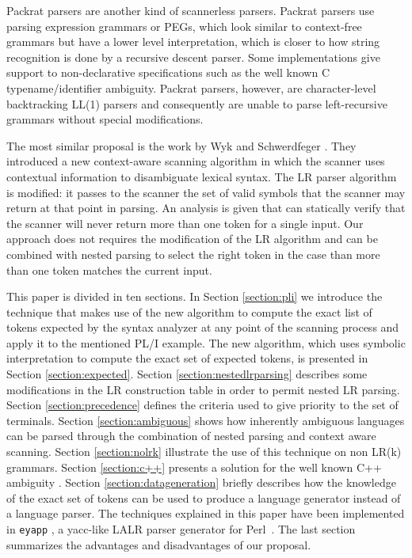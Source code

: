 Packrat parsers \cite{ford2,grimm} are another kind of
scannerless parsers. Packrat parsers use
parsing expression grammars or PEGs, 
which look similar to context-free grammars but have a lower level interpretation, 
which is closer to how string recognition is done by a recursive descent parser.
Some implementations \cite{grimm} give support 
to non-declarative specifications such as the well known C typename/identifier
ambiguity. 
Packrat parsers, however, are character-level backtracking LL(1) parsers
and consequently are unable to parse
left-recursive grammars without special modifications.

The most similar proposal is the work by Wyk and Schwerdfeger \cite{wyk}.
They introduced a new context-aware scanning algorithm in
which the scanner uses contextual information to disambiguate lexical
syntax. The LR parser algorithm is modified:
it passes to the scanner the set of valid symbols
that the scanner may return at that point in parsing. 
An analysis is given that can
statically verify that the scanner will never return more than one
token for a single input.
Our approach does not requires the modification of the LR algorithm
and can be combined with nested parsing to select the right token in the case than 
more than one token matches the current input.

This paper is divided in ten sections.
In Section
\ref{section:pli} 
we introduce the technique that makes use of
the new algorithm to compute the exact list of tokens 
expected by the syntax analyzer at any point of the scanning process and apply it
to the mentioned PL/I example.
The new algorithm, which uses symbolic interpretation to compute the exact set of expected tokens,
is presented in Section \ref{section:expected}.
Section \ref{section:nestedlrparsing} describes some modifications 
in the LR construction table in order to 
permit nested LR parsing. 
Section
\ref{section:precedence}
defines the criteria used to give priority to the set of terminals.
Section \ref{section:ambiguous} shows
how inherently 
ambiguous languages can be parsed through the
combination of nested parsing and context aware scanning.
Section \ref{section:nolrk} illustrate the use of this technique
on non LR(k) grammars.
Section \ref{section:c++} presents a solution for the well known C++ ambiguity
\cite{c++}.
Section
\ref{section:datageneration}
briefly describes how the knowledge of the exact set of tokens can be used to 
produce a language generator instead of a language parser.
The techniques explained in this paper have been implemented in 
\verb|eyapp| \cite{Rodriguez:Leon},
a yacc-like LALR parser generator \cite{Johnsonyacc} for \mbox{Perl \cite{Wall:Perl,perl6}}. 
The last section 
summarizes the advantages and disadvantages of our proposal.
%
%

